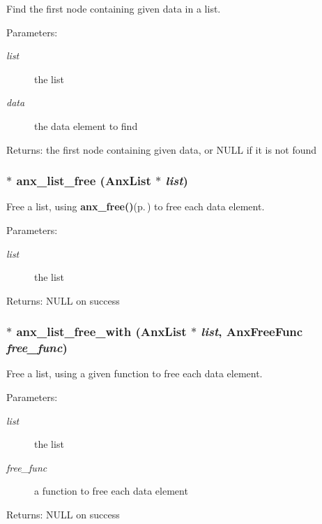 Find the first node containing given data in a list. 

\begin{Desc}
\item[Parameters:]
\begin{description}
\item[{\em list}]the list \item[{\em data}]the data element to find \end{description}
\end{Desc}
\begin{Desc}
\item[Returns:]the first node containing given data, or NULL if it is not found \end{Desc}
\subsubsection{$\ast$ anx\_\-list\_\-free ({\bf Anx\-List} $\ast$ {\em list})}\label{anx__list_8h_a15}


Free a list, using {\bf anx\_\-free()}{\rm (p.\,\pageref{anx__core_8h_a1})} to free each data element. 

\begin{Desc}
\item[Parameters:]
\begin{description}
\item[{\em list}]the list \end{description}
\end{Desc}
\begin{Desc}
\item[Returns:]NULL on success \end{Desc}
\subsubsection{$\ast$ anx\_\-list\_\-free\_\-with ({\bf Anx\-List} $\ast$ {\em list}, {\bf Anx\-Free\-Func} {\em free\_\-func})}\label{anx__list_8h_a14}


Free a list, using a given function to free each data element. 

\begin{Desc}
\item[Parameters:]
\begin{description}
\item[{\em list}]the list \item[{\em free\_\-func}]a function to free each data element \end{description}
\end{Desc}
\begin{Desc}
\item[Returns:]NULL on success \end{Desc}
